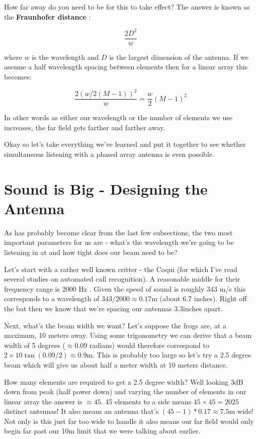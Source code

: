 \documentclass[12pt,a6paper]{book}
\begin{document}
How far away do you need to be for this to take effect? The answer is known as the \textbf{Fraunhofer distance} \cite{wikifarfield}:

\begin{equation}
\frac{2D^2}{w}
\end{equation}

where $w$ is the wavelength and $D$ is the largest dimension of the antenna. If we assume a half wavelength spacing between elements then for a linear array this becomes:

 
\begin{equation}
\frac{2(w/2(M-1))^2}{w}=\frac{w}{2}(M-1)^2
\end{equation}

In other words as either our wavelength or the number of elements we use increases, the far field gets farther and farther away. 

Okay so let's take everything we've learned and put it together to see whether simultaneous listening with a phased array antenna is even possible. 

\section{Sound is Big - Designing the Antenna}

As has probably become clear from the last few subsections, the two most important parameters for us are - what's the wavelength we're going to be listening in at and how tight does our beam need to be? 

Let's start with a rather well known critter - the Coqui (for which I've read several studies on automated call recognition). A reasonable middle for their frequency range is 2000 Hz \cite{mlcoqui}. Given the speed of sound is roughly 343 m/s this corresponds to a wavelength of $343/2000\approx 0.17$m (about 6.7 inches). Right off the bat then we know that we're spacing our antennas $3.3$inches apart. 

Next, what's the beam width we want? Let's suppose the frogs are, at a maximum, 10 meters away. Using some trigonometry we can derive that a beam width of 5 degrees ($\approx 0.09$ radians) would therefore correspond to $2\times 10 \tan(0.09/2)\approx0.9$m. This is probably too large so let's try a 2.5 degree beam which will give us about half a meter width at 10 meters distance. 

How many elements are required to get a 2.5 degree width? Well looking 3dB down from peak (half power down) and varying the number of elements in our linear array the answer is $\approx 45$. 45 elements to a side means $45\times45=2025$ distinct antennas! It also means an antenna that's $(45-1)*0.17\approx 7.5$m wide! Not only is this just far too wide to handle it also means our far field would only begin far past our 10m limit that we were talking about earlier. 
\end{document}
